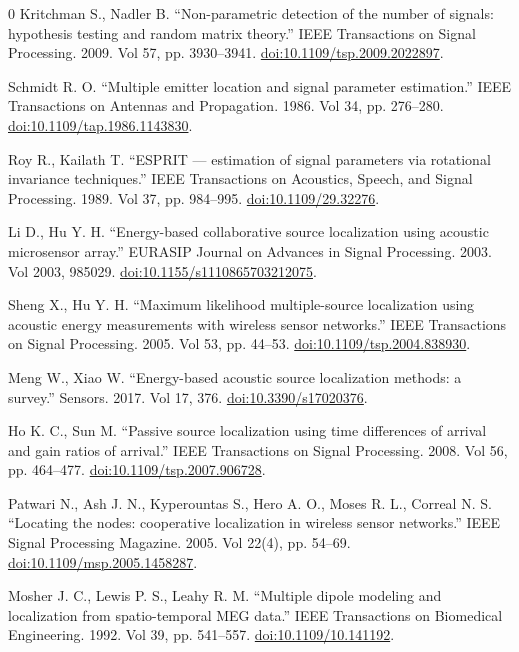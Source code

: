 \documentclass{article}
\begin{document}
\begin{thebibliography}{0}
 Kritchman S., Nadler B. ``Non-parametric detection of the number of signals: hypothesis testing and random matrix theory.'' IEEE Transactions on Signal Processing. 2009. Vol 57, pp. 3930--3941. \href{https://doi.org/10.1109/tsp.2009.2022897}{doi:10.1109/tsp.2009.2022897}.

 Schmidt R. O. ``Multiple emitter location and signal parameter estimation.'' IEEE Transactions on Antennas and Propagation. 1986. Vol 34, pp. 276--280. \href{https://doi.org/10.1109/tap.1986.1143830}{doi:10.1109/tap.1986.1143830}.

 Roy R., Kailath T. ``ESPRIT --- estimation of signal parameters via rotational invariance techniques.'' IEEE Transactions on Acoustics, Speech, and Signal Processing. 1989. Vol 37, pp. 984--995. \href{https://doi.org/10.1109/29.32276}{doi:10.1109/29.32276}.

 Li D., Hu Y. H. ``Energy-based collaborative source localization using acoustic microsensor array.'' EURASIP Journal on Advances in Signal Processing. 2003. Vol 2003, 985029. \href{https://doi.org/10.1155/s1110865703212075}{doi:10.1155/s1110865703212075}.

 Sheng X., Hu Y. H. ``Maximum likelihood multiple-source localization using acoustic energy measurements with wireless sensor networks.'' IEEE Transactions on Signal Processing. 2005. Vol 53, pp. 44--53. \href{https://doi.org/10.1109/tsp.2004.838930}{doi:10.1109/tsp.2004.838930}.

 Meng W., Xiao W. ``Energy-based acoustic source localization methods: a survey.'' Sensors. 2017. Vol 17, 376. \href{https://doi.org/10.3390/s17020376}{doi:10.3390/s17020376}.

 Ho K. C., Sun M. ``Passive source localization using time differences of arrival and gain ratios of arrival.'' IEEE Transactions on Signal Processing. 2008. Vol 56, pp. 464--477. \href{https://doi.org/10.1109/tsp.2007.906728}{doi:10.1109/tsp.2007.906728}.

 Patwari N., Ash J. N., Kyperountas S., Hero A. O., Moses R. L., Correal N. S. ``Locating the nodes: cooperative localization in wireless sensor networks.'' IEEE Signal Processing Magazine. 2005. Vol 22(4), pp. 54--69. \href{https://doi.org/10.1109/msp.2005.1458287}{doi:10.1109/msp.2005.1458287}.

 Mosher J. C., Lewis P. S., Leahy R. M. ``Multiple dipole modeling and localization from spatio-temporal MEG data.'' IEEE Transactions on Biomedical Engineering. 1992. Vol 39, pp. 541--557. \href{https://doi.org/10.1109/10.141192}{doi:10.1109/10.141192}.


\end{thebibliography}
\end{document}
